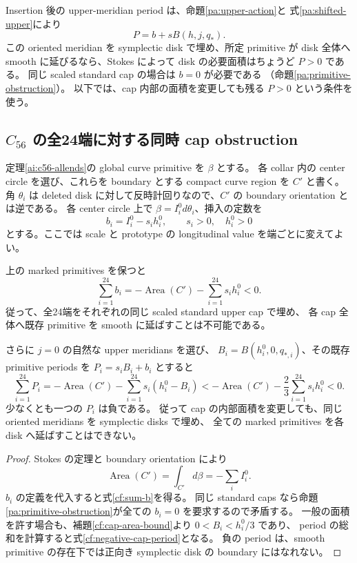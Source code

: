 Insertion 後の upper-meridian period は、命題\ref{pa:upper-action}と
式\eqref{pa:shifted-upper}により
\[
 P=b+sB(h,j,q_*).
\]
この oriented meridian を symplectic disk で埋め、所定 primitive が disk 全体へ
smooth に延びるなら、Stokes によって disk の必要面積はちょうど $P>0$ である。
同じ scaled standard cap の場合は $b=0$ が必要である
（命題\ref{pa:primitive-obstruction}）。
以下では、cap 内部の面積を変更しても残る $P>0$ という条件を使う。

\subsection{$C_{56}$ の全24端に対する同時 cap obstruction}

定理\ref{ai:c56-allends}の global curve primitive を $\beta$ とする。
各 collar 内の center circle を選び、これらを boundary とする compact curve region を $C'$ と書く。
角 $\theta_i$ は deleted disk に対して反時計回りなので、$C'$ の boundary orientation とは逆である。
各 center circle 上で $\beta=I_i^0d\theta_i$、挿入の定数を
\[
 b_i=I_i^0-s_i h_i^0,\qquad s_i>0,\quad h_i^0>0
\]
とする。ここでは scale と prototype の longitudinal value を端ごとに変えてよい。

\begin{corollary}\label{cf:allends-obstruction}
上の marked primitives を保つと
\begin{equation}\label{cf:sum-b}
 \sum_{i=1}^{24}b_i
 =-\operatorname{Area}(C')-\sum_{i=1}^{24}s_i h_i^0<0.
\end{equation}
従って、全24端をそれぞれの同じ scaled standard upper cap で埋め、
各 cap 全体へ既存 primitive を smooth に延ばすことは不可能である。

さらに $j=0$ の自然な upper meridians を選び、
$B_i=B(h_i^0,0,q_{*,i})$、その既存 primitive periods を $P_i=s_iB_i+b_i$ とすると
\begin{equation}\label{cf:negative-cap-period}
 \sum_{i=1}^{24}P_i
 =-\operatorname{Area}(C')-\sum_{i=1}^{24}s_i(h_i^0-B_i)
 <-\operatorname{Area}(C')-\frac23\sum_{i=1}^{24}s_i h_i^0<0.
\end{equation}
少なくとも一つの $P_i$ は負である。
従って cap の内部面積を変更しても、同じ oriented meridians を symplectic disks で埋め、
全ての marked primitives を各 disk へ延ばすことはできない。
\end{corollary}

\begin{proof}
Stokes の定理と boundary orientation により
\[
 \operatorname{Area}(C')=\int_{C'}d\beta=-\sum_i I_i^0.
\]
$b_i$ の定義を代入すると式\eqref{cf:sum-b}を得る。
同じ standard caps なら命題\ref{pa:primitive-obstruction}が全ての $b_i=0$ を要求するので矛盾する。
一般の面積を許す場合も、補題\ref{cf:cap-area-bound}より $0<B_i<h_i^0/3$ であり、
period の総和を計算すると式\eqref{cf:negative-cap-period}となる。
負の period は、smooth primitive の存在下では正向き symplectic disk の boundary にはなれない。
\end{proof}

